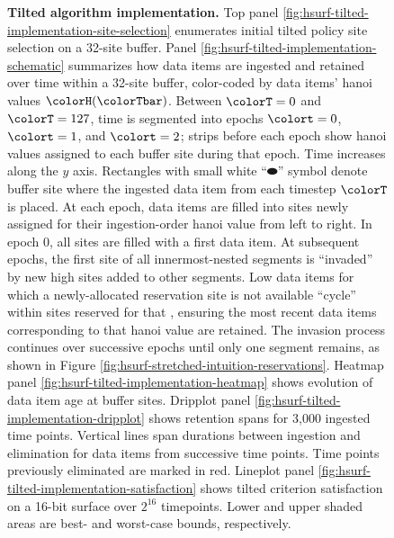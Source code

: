 \begin{figure}[htbp!]
\vspace{-2ex}\caption{%
  \textbf{Tilted algorithm implementation.}
  \footnotesize
  Top panel \ref{fig:hsurf-tilted-implementation-site-selection} enumerates initial tilted policy site selection on a 32-site buffer.
  Panel \ref{fig:hsurf-tilted-implementation-schematic} summarizes how data items are ingested and retained over time within a 32-site buffer, color-coded by data items' hanoi values $\colorH(\colorTbar)$.
  Between $\colorT=0$ and $\colorT=127$, time is segmented into epochs $\colort=0$, $\colort=1$, and $\colort=2$; strips before  each epoch show hanoi values assigned to each buffer site during that epoch.
  Time increases along the $y$ axis.
  Rectangles with small white ``$\blkhorzoval$'' symbol denote buffer site where the ingested data item from each timestep $\colorT$ is placed.
  At each epoch, data items are filled into sites newly assigned for their ingestion-order hanoi value from left to right.
  In epoch 0, all sites are filled with a first data item.
  At subsequent epochs, the first site of all innermost-nested segments is ``invaded'' by new high \hv{} sites added to other segments.
  Low \hv{} data items for which a newly-allocated reservation site is not available ``cycle'' within sites reserved for that \hv{}, ensuring the most recent data items corresponding to that hanoi value are retained.
  The invasion process continues over successive epochs until only one segment remains, as shown in Figure \ref{fig:hsurf-stretched-intuition-reservations}.
  Heatmap panel \ref{fig:hsurf-tilted-implementation-heatmap} shows evolution of data item age at buffer sites.
  Dripplot panel \ref{fig:hsurf-tilted-implementation-dripplot} shows retention spans for 3,000 ingested time points.
  Vertical lines span durations between ingestion and elimination for data items from successive time points.
  Time points previously eliminated are marked in red.
  Lineplot panel \ref{fig:hsurf-tilted-implementation-satisfaction} shows tilted criterion satisfaction on a 16-bit surface over $2^{16}$ timepoints.
  Lower and upper shaded areas are best- and worst-case bounds, respectively.
}
\label{fig:hsurf-tilted-implementation}

\end{figure}
